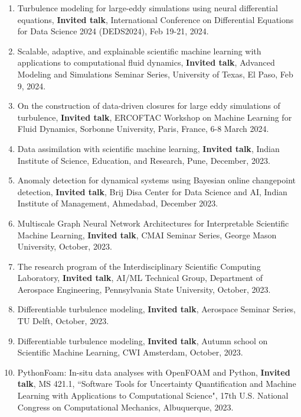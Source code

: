 \documentclass[letterpaper]{article}
\begin{document}
\begin{enumerate}

\item Turbulence modeling for large-eddy simulations using neural differential equations, \textbf{Invited talk}, International Conference on Differential Equations for Data Science 2024 (DEDS2024), Feb 19-21, 2024.

\item Scalable, adaptive, and explainable scientific machine learning with applications to computational fluid dynamics, \textbf{Invited talk}, Advanced Modeling and Simulations Seminar Series, University of Texas, El Paso, Feb 9, 2024.

\item On the construction of data-driven closures for large eddy simulations of turbulence, \textbf{Invited talk}, ERCOFTAC Workshop on Machine Learning for Fluid Dynamics, Sorbonne University, Paris, France, 6-8 March 2024.

\item Data assimilation with scientific machine learning, \textbf{Invited talk}, Indian Institute of Science, Education, and Research, Pune, December, 2023.

\item Anomaly detection for dynamical systems using Bayesian online changepoint detection, \textbf{Invited talk}, Brij Disa Center for Data Science and AI, Indian Institute of Management, Ahmedabad, December 2023.

\item Multiscale Graph Neural Network Architectures for Interpretable Scientific Machine Learning, \textbf{Invited talk}, CMAI Seminar Series, George Mason University, October, 2023.

\item The research program of the Interdisciplinary Scientific Computing Laboratory, \textbf{Invited talk}, AI/ML Technical Group, Department of Aerospace Engineering, Pennsylvania State University, October, 2023.

\item Differentiable turbulence modeling, \textbf{Invited talk}, Aerospace Seminar Series, TU Delft, October, 2023.

\item Differentiable turbulence modeling, \textbf{Invited talk}, Autumn school on Scientific Machine Learning, CWI Amsterdam, October, 2023.

\item PythonFoam: In-situ data analyses with OpenFOAM and Python, \textbf{Invited talk}, MS 421.1, ``Software Tools for Uncertainty Quantification and Machine Learning with Applications to Computational Science", 17th U.S. National Congress on Computational Mechanics, Albuquerque, 2023.


\end{enumerate}
\end{document}
